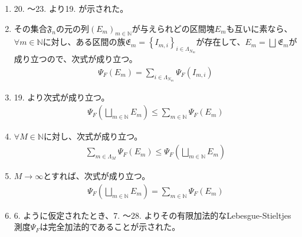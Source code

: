 \documentclass[dvipdfmx]{jsarticle}
\begin{document}
\begin{enumerate}
\item
  20. ～23. より19. が示された。
\item
  その集合$\mathfrak{F}_{n}$の元の列$\left( E_{m} \right)_{m \in \mathbb{N}}$が与えられどの区間塊$E_{m}$も互いに素なら、$\forall m \in \mathbb{N}$に対し、ある区間の族$\mathfrak{E}_{m} = \left\{ I_{m,i} \right\}_{i \in \varLambda_{N_{m}}}$が存在して、$E_{m} = \bigsqcup_{} \mathfrak{E}_{m}$が成り立つので、次式が成り立つ。
  \begin{align*}
  \varPsi_{F}\left( E_{m} \right) = \sum_{i \in \varLambda_{N_{m}}} {\varPsi_{F}\left( I_{m,i} \right)}
  \end{align*}
\item
  19. より次式が成り立つ。
  \begin{align*}
  \varPsi_{F}\left( \bigsqcup_{m \in \mathbb{N}} E_{m} \right) \leq \sum_{m \in \mathbb{N}} {\varPsi_{F}\left( E_{m} \right)}
  \end{align*}
\item
  $\forall M \in \mathbb{N}$に対し、次式が成り立つ。
  \begin{align*}
  \sum_{m \in \varLambda_{M}} {\varPsi_{F}\left( E_{m} \right)} \leq \varPsi_{F}\left( \bigsqcup_{m \in \mathbb{N}} E_{m} \right)
  \end{align*}
\item
  $M \rightarrow \infty$とすれば、次式が成り立つ。
  \begin{align*}
  \varPsi_{F}\left( \bigsqcup_{m \in \mathbb{N}} E_{m} \right) = \sum_{m \in \mathbb{N}} {\varPsi_{F}\left( E_{m} \right)}
  \end{align*}
\item
  6. ように仮定されたとき、7. ～28. よりその有限加法的なLebesgue-Stieltjes測度$\varPsi_{F}$は完全加法的であることが示された。
\end{enumerate}
\end{document}
